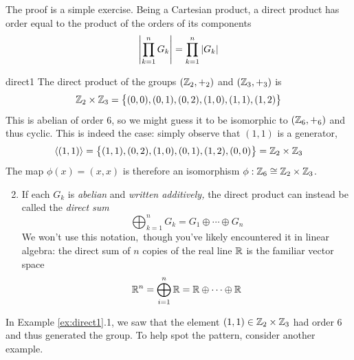 The proof is a simple exercise. Being a Cartesian product, a direct product has order equal to the product of the orders of its components
\[
	\left| \prod\limits_{k=1}^n G_k\right|=\prod\limits_{k=1}^n\left| G_k\right|
\]
\vspace{2pt}


\begin{examples}{}{direct1}
	\exstart The direct product of the groups $(\mathbb{Z}_2,+_2)$ and $(\mathbb{Z}_3,+_3)$ is
	\[
		\mathbb{Z}_2\times\mathbb{Z}_3=\bigl\{(0,0),(0,1),(0,2),(1,0),(1,1),(1,2)\bigr\}
	\]
	This is abelian of order 6, so we might guess it to be isomorphic to $(\mathbb{Z}_6,+_6)$ and thus cyclic. This is indeed the case: simply observe that $(1,1)$ is a generator,
	\[
		\left\langle (1,1)\right\rangle=\bigl\{(1,1),(0,2),(1,0),(0,1),(1,2),(0,0)\bigr\}=\mathbb{Z}_2\times\mathbb{Z}_3
	\]
	The map $\phi(x)=(x,x)$ is therefore an isomorphism $\phi:\mathbb{Z}_6\cong\mathbb{Z}_2\times \mathbb{Z}_3$.

	\goodbreak

	\begin{enumerate}\setcounter{enumi}{1}
		\item If each $G_k$ is \emph{abelian} and \emph{written additively,} the direct product can instead be called the \emph{direct sum}
		\[
			\bigoplus_{k=1}^nG_k=G_1\oplus\cdots\oplus G_n
		\]
		We won't use this notation,\footnotemark\ though you've likely encountered it in linear algebra: the direct sum of $n$ copies of the real line $\mathbb{R}$ is the familiar vector space
		\[
			\mathbb{R}^n=\bigoplus_{i=1}^n\mathbb{R}=\mathbb{R}\oplus\cdots\oplus\mathbb{R}
		\]
	\end{enumerate}
\end{examples}




In Example \ref{ex:direct1}.1, we saw that the element $(1,1)\in\mathbb{Z}_2\times\mathbb{Z}_3$ had order 6 and thus generated the group. To help spot the pattern, consider another example.

